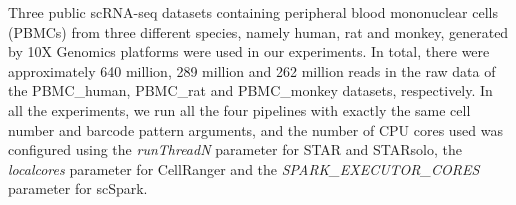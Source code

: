 \documentclass[conference]{IEEEtran}
\begin{document}
Three public scRNA-seq datasets containing peripheral blood mononuclear cells (PBMCs) from three different species, namely human, rat and monkey, generated by 10X Genomics platforms were used in our experiments. 
In total, there were approximately 640 million, 289 million and 262 million reads in the raw data of the PBMC\_human, PBMC\_rat and PBMC\_monkey datasets, respectively. 
In all the experiments, we run all the four pipelines with exactly the same cell number and barcode pattern arguments, and the number of CPU cores used was configured using the \textit{runThreadN} parameter for STAR and STARsolo, the \textit{localcores} parameter for CellRanger and the \textit{SPARK\_EXECUTOR\_CORES} parameter for scSpark.





\end{document}
